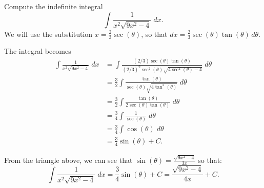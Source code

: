 \documentclass[handout]{ximera}
\begin{document}
\begin{example}[example 7]
Compute the indefinite integral
\[
\int \frac{1}{x^2\sqrt{9x^2-4}} \; dx.
\]
We will use the substitution $x = \frac23\sec(\theta)$,
so that $dx = \frac23\sec(\theta)\tan(\theta) \, d\theta$.

The integral becomes
\begin{align*}
\int \frac{1}{x^2\sqrt{9x^2-4}}\; dx &= \int \frac{(2/3)\sec(\theta)\tan(\theta)}{(2/3)^2\sec^2(\theta)\sqrt{4\sec^2(\theta)-4}}\; d\theta\\[6pt]
                                 &=  \frac32\int \frac{\tan(\theta)}{\sec(\theta)\sqrt{4\tan^2(\theta)}}\; d\theta\\[6pt]
                                 &=  \frac32\int \frac{\tan(\theta)}{2\sec(\theta)\tan(\theta)}\; d\theta\\[6pt]
                                  &=  \frac34 \int \frac{1}{\sec(\theta)} \; d\theta\\[6pt]
                                  &= \frac34 \int \cos(\theta)  \; d\theta\\[6pt]
                                  &= \frac34 \sin(\theta) + C.
\end{align*}


\begin{image}
\end{image}




From the triangle above, we can see that $\sin(\theta) = \frac{\sqrt{9x^2-4}}{3x}$ so that:
\[
\int \frac{1}{x^2\sqrt{9x^2-4}} \; dx =  \frac34 \sin(\theta) + C =  \frac{\sqrt{9x^2 - 4}}{4x} + C.
\]

\end{example}
\end{document}
